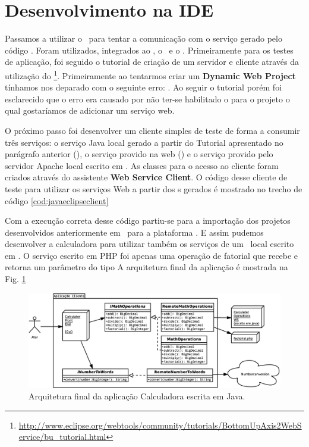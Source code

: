 
\section{Desenvolvimento na IDE \Eclipsev}

Passamos a utilizar o \Eclipsev\ para tentar a comunicação com o serviço gerado
pelo código \PHP. Foram utilizados, integrados ao \Eclipse, o \ApacheTomcatv\ e o
\ApacheAxisDoisv. Primeiramente para os testes de aplicação, foi seguido o
tutorial de criação de um servidor e cliente através da utilização do
\ApacheAxisDoisv\footnote{\url{http://www.eclipse.org/webtools/community/tutorials/BottomUpAxis2WebService/bu_tutorial.html}}.
Primeiramente ao tentarmos criar um \textbf{Dynamic Web Project} tínhamos nos
deparado com o seguinte erro: . Ao
seguir o tutorial porém foi esclarecido que o erro era causado por não ter-se
habilitado o   para o projeto o qual
gostaríamos de adicionar um serviço web.

O próximo passo foi desenvolver um cliente simples de teste de forma a consumir três
serviços: o serviço Java local gerado a partir do Tutorial apresentado no parágrafo
anterior (), o serviço provido na web ()
e o serviço provido pelo servidor Apache local escrito em \php. As
classes  para o acesso ao cliente foram criados através do
assistente \textbf{Web Service Client}. O código desse cliente de teste para
utilizar os serviços Web a partir dos \stub s gerados é mostrado no trecho de
código \ref{cod:javaeclipseclient}

Com a execução correta desse código partiu-se para a importação dos projetos
desenvolvidos anteriormente em \NetBeans\ para a plataforma \Eclipse. E assim
pudemos desenvolver a calculadora para utilizar também os serviços de um
\WebService\ local escrito em \PHP. O serviço escrito em PHP foi apenas uma
operação de fatorial que recebe e retorna um parâmetro do tipo 
A arquitetura final da aplicação é mostrada
na Fig. \ref{fig:arquitetura:final} 

\begin{figure}[htb]
  \centering
  \includegraphics[width=\textwidth]{imgs/arquitetura_final}
  \caption{Arquitetura final da aplicação Calculadora escrita em Java.}
  \label{fig:arquitetura:final}
\end{figure}

